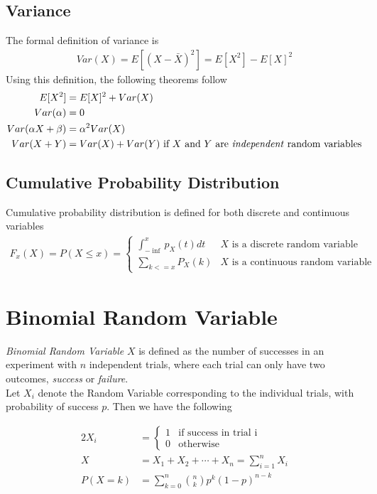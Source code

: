 \documentclass[11pt, a4paper]{article}
\begin{document}
    \subsection{Variance}
    The formal definition of variance is
    \begin{align*}
        Var(X) = E[(X - \bar{X})^{2}] = E[X^{2}] - E[X]^{2}
    \end{align*}
    Using this definition, the following theorems follow
    \begin{align*}
        E[X^{2}] &= E[X]^{2} + Var(X) \\
        Var(\alpha) &= 0 \\
        Var(\alpha X + \beta) &= \alpha^{2} Var(X) \\
        Var(X + Y) &= Var(X) + Var(Y) \text{  if $X$ and $Y$ are \emph{independent} random variables}
    \end{align*}

    \subsection{Cumulative Probability Distribution}
    Cumulative probability distribution is defined for both discrete and continuous variables
    \begin{align*}
        F_{x}(X) = P(X \leq x) = \begin{cases} \int_{-\inf}^{x} p_{X}(t) dt &\mbox{$X$ is a discrete random variable}\\
                                               \sum_{k <= x} P_{X}(k) &\mbox{$X$ is a continuous random variable} \end{cases}
    \end{align*}



    \section{Binomial Random Variable}
    \emph{Binomial Random Variable} $X$ is defined as the number of successes in an experiment with $n$ independent trials, where each trial can only have two outcomes, \emph{success} or \emph{failure}.\\
    Let $X_{i}$ denote the Random Variable corresponding to the individual trials, with probability of success $p$. Then we have the following

    \begin{alignat*}{2}
        X_{i} &= \begin{cases} 1 &\mbox{if success in trial i}\\ 
                                0 &\mbox{otherwise} \end{cases} \tag*{indicator variable} \\
        X &= X_{1} + X_{2} + \cdots + X_{n} = \sum_{i=1}^{n} X_{i} \\
        P(X=k) &= \sum_{k=0}^{n} \binom{n}{k} p^{k} (1 - p)^{n-k}
    \end{alignat*}
\end{document}
